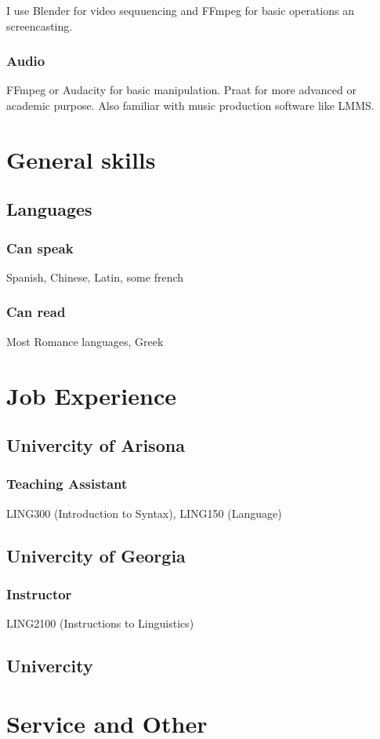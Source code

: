 \documentclass{article}
\begin{document}
I use Blender for video sequuencing and FFmpeg for basic operations an screencasting.

\subsubsection{Audio}

FFmpeg or Audacity for basic manipulation. Praat for more advanced or academic purpose. Also familiar with music production software like LMMS.

\section{General skills}

\subsection{Languages}

\subsubsection{Can speak}

Spanish, Chinese, Latin, some french

\subsubsection{Can read} 

Most Romance languages, Greek

\section{Job Experience}

\subsection{Univercity of Arisona}

\subsubsection{Teaching Assistant}

LING300 (Introduction to Syntax), LING150 (Language)

\subsection{Univercity of Georgia}

\subsubsection{Instructor}

LING2100 (Instructions to Linguistics)

\subsection{Univercity}


\section{Service and Other}
\end{document}
